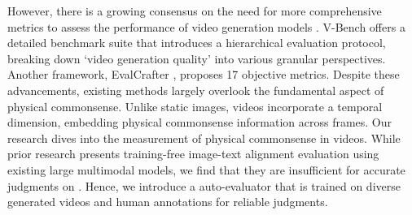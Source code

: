However, there is a growing consensus on the need for more comprehensive metrics to assess the performance of video generation models \cite{huang2023vbench, liu2024evalcrafter, subjectbench, lin2024evaluating}. V-Bench \cite{huang2023vbench} offers a detailed benchmark suite that introduces a hierarchical evaluation protocol, breaking down `video generation quality’ into various granular perspectives. Another framework, EvalCrafter \cite{liu2024evalcrafter}, proposes 17 objective metrics. Despite these advancements, existing methods largely overlook the fundamental aspect of physical commonsense. Unlike static images, videos incorporate a temporal dimension, embedding physical commonsense information across frames. Our research dives into the measurement of physical commonsense \cite{bisk2020piqa} in videos. While prior research \cite{ku2023viescore} presents training-free image-text alignment evaluation using existing large multimodal models, we find that they are insufficient for accurate judgments on \name{}. Hence, we introduce a \model{} auto-evaluator that is trained on diverse generated videos and human annotations for reliable judgments. 

